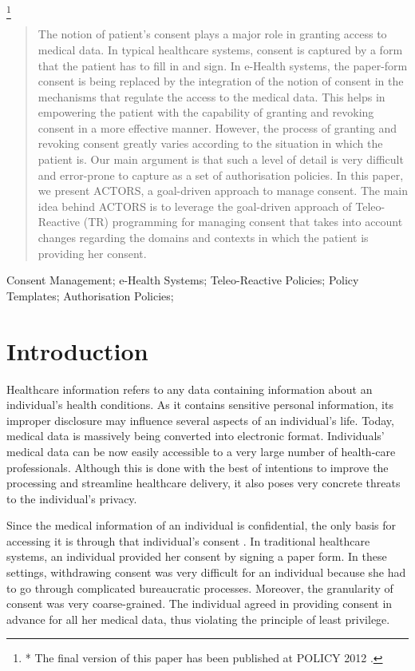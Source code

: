 \documentclass[10pt, conference, compsocconf]{IEEEtran}
\newcommand\blfootnote[1]{\begingroup
  \renewcommand\thefootnote{}\footnote{#1}\addtocounter{footnote}{-1}\endgroup
}
\begin{document}
\blfootnote{* The final version of this paper has been published at POLICY 2012 \cite{Asghar2012-POLICY}.}

\begin{abstract}

The notion of patient's consent plays a major role in granting access to medical data. In typical healthcare systems, consent is captured by a form that the patient has to fill in and sign. In e-Health systems, the paper-form consent is being replaced by the integration of the notion of consent in the mechanisms that regulate the access to the medical data. This helps in empowering the patient with the capability of granting and revoking consent in a more effective manner. However, the process of granting and revoking consent greatly varies according to the situation in which the patient is. Our main argument is that such a level of detail is very difficult and error-prone to capture as a set of authorisation policies. In this paper, we present ACTORS, a goal-driven approach to manage consent. The main idea behind ACTORS is to leverage the goal-driven approach of Teleo-Reactive (TR) programming for managing consent that takes into account changes regarding the domains and contexts in which the patient is providing her consent.

\end{abstract}


\begin{IEEEkeywords}
Consent Management; e-Health Systems; Teleo-Reactive Policies; Policy Templates; Authorisation Policies;
\end{IEEEkeywords}


\section{Introduction}
Healthcare information refers to any data containing information about an individual's health conditions. As it contains sensitive personal information, its improper disclosure may influence several aspects of an individual's life. Today, medical data is massively being converted into electronic format. Individuals' medical data can be now easily accessible to a very large number of health-care professionals. Although this is done with the best of intentions to improve the processing and streamline healthcare delivery, it also poses very concrete threats to the individual's privacy.

Since the medical information of an individual is confidential, the only basis for accessing it is through that individual's consent \cite{EC1995}. In traditional healthcare systems, an individual provided her consent by signing a paper form. In these settings, withdrawing consent was very difficult for an individual because she had to go through complicated bureaucratic processes. Moreover, the granularity of consent was very coarse-grained. The individual agreed in providing consent in advance for all her medical data, thus violating the principle of least privilege.
\end{document}
